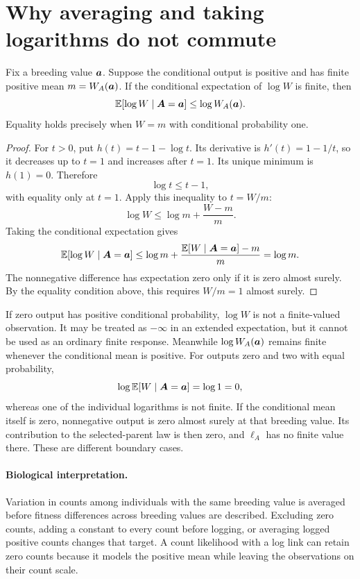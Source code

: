 \section{Why averaging and taking logarithms do not commute}

\begin{proposition}
\label{conditioning:jensen}
Fix a breeding value \(\boldsymbol{a}\). Suppose the conditional output is positive
and has finite positive mean \(m=W_A(\boldsymbol{a})\). If the conditional expectation
of \(\log W\) is finite, then
\begin{equation}
 \mathbb E[\log W\mid\boldsymbol{A}=\boldsymbol{a}]\leq\log W_A(\boldsymbol{a}).
 \label{conditioning:jensen_inequality}
\end{equation}
Equality holds precisely when \(W=m\) with conditional probability one.
\end{proposition}

\begin{proof}
For \(t>0\), put \(h(t)=t-1-\log t\). Its derivative is
\(h'(t)=1-1/t\), so it decreases up to \(t=1\) and increases after \(t=1\).
Its unique minimum is \(h(1)=0\). Therefore
\[
 \log t\leq t-1,
\]
with equality only at \(t=1\). Apply this inequality to \(t=W/m\):
\[
 \log W\leq\log m+\frac{W-m}{m}.
\]
Taking the conditional expectation gives
\[
 \mathbb E[\log W\mid\boldsymbol{A}=\boldsymbol{a}]
 \leq\log m+\frac{\mathbb E[W\mid\boldsymbol{A}=\boldsymbol{a}]-m}{m}
 =\log m.
\]
The nonnegative difference has expectation zero only if it is zero almost
surely. By the equality condition above, this requires \(W/m=1\) almost surely.
\end{proof}

If zero output has positive conditional probability, \(\log W\) is not a
finite-valued observation. It may be treated as \(-\infty\) in an extended
expectation, but it cannot be used as an ordinary finite response. Meanwhile
\(\log W_A(\boldsymbol{a})\) remains finite whenever the conditional mean is positive.
For outputs zero and two with equal probability,
\[
 \log\mathbb E[W\mid\boldsymbol{A}=\boldsymbol{a}]=\log 1=0,
\]
whereas one of the individual logarithms is not finite. If the conditional
mean itself is zero, nonnegative output is zero almost surely at that breeding
value. Its contribution to the selected-parent law is then zero, and
\(\ell_A\) has no finite value there. These are different boundary cases.

\paragraph{Biological interpretation.}
Variation in counts among individuals with the same breeding value is averaged
before fitness differences across breeding values are described. Excluding zero
counts, adding a constant to every count before logging, or averaging logged
positive counts changes that target. A count likelihood with a log link can
retain zero counts because it models the positive mean while leaving the
observations on their count scale.


